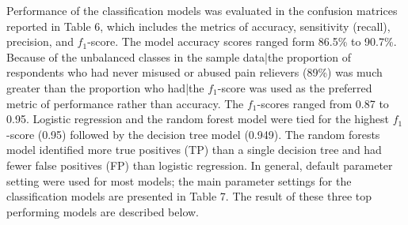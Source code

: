 \documentclass[sigconf]{acmart}
\begin{document}
Performance of the classification models was evaluated in the confusion 
matrices reported in Table 6, which includes the metrics of accuracy, 
sensitivity (recall), precision, and $f_1$-score. The model accuracy 
scores ranged form 86.5\% to 90.7\%. Because of the unbalanced classes in 
the sample data|the proportion of respondents who had never misused or 
abused pain relievers (89\%) was much greater than the proportion who had|the $f_1$-score was used as the preferred metric of performance rather 
than accuracy. The $f_1$-scores ranged from 0.87 to 0.95. Logistic 
regression and the random forest model were tied for the highest 
$f_1$-score (0.95) followed by the decision tree model (0.949). The 
random forests model identified more true positives (TP) than a single 
decision tree and had fewer false positives (FP) than logistic regression. 
In general, default parameter setting were used for most models; the main 
parameter settings for the classification models are presented in Table 7.
The result of these three top performing models are described below.  
 
\end{document}
